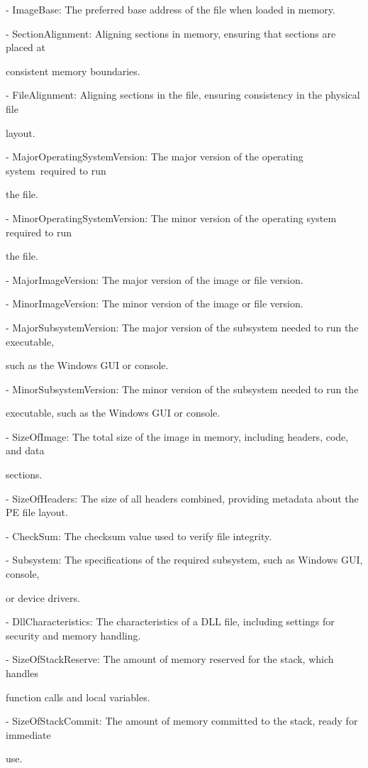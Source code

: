 \begin{multicols}{2}
- ImageBase: The preferred base address of the file when loaded in
memory.

- SectionAlignment: Aligning sections in memory, ensuring that sections
are placed at

consistent memory boundaries.

- FileAlignment: Aligning sections in the file, ensuring consistency in
the physical file

layout.

- MajorOperatingSystemVersion: The major version of the operating
system~required to run

the file.

- MinorOperatingSystemVersion: The minor version of the operating system
required to run

the file.

- MajorImageVersion: The major version of the image or file version.

- MinorImageVersion: The minor version of the image or file version.

- MajorSubsystemVersion: The major version of the subsystem needed to
run the executable,

such as the Windows GUI or console.

- MinorSubsystemVersion: The minor version of the subsystem needed to
run the

executable, such as the Windows GUI or console.

- SizeOfImage: The total size of the image in memory, including headers,
code, and data

sections.

- SizeOfHeaders: The size of all headers combined, providing metadata
about the PE file layout.

- CheckSum: The checksum value used to verify file integrity.

- Subsystem: The specifications of the required subsystem, such as
Windows GUI, console,

or device drivers.

- DllCharacteristics: The characteristics of a DLL file, including
settings for security and memory handling.

- SizeOfStackReserve: The amount of memory reserved for the stack, which
handles

function calls and local variables.

- SizeOfStackCommit: The amount of memory committed to the stack, ready
for immediate

use.


\end{multicols}
